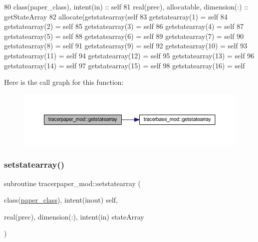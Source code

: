 \begin{DoxyCode}
80     \textcolor{keywordtype}{class}(paper\_class), \textcolor{keywordtype}{intent(in)} :: self
81     \textcolor{keywordtype}{real(prec)}, \textcolor{keywordtype}{allocatable}, \textcolor{keywordtype}{dimension(:)} :: getStateArray
82     \textcolor{keyword}{allocate}(getstatearray(self%
83     getstatearray(1) = self%
84     getstatearray(2) = self%
85     getstatearray(3) = self%
86     getstatearray(4) = self%
87     getstatearray(5) = self%
88     getstatearray(6) = self%
89     getstatearray(7) = self%
90     getstatearray(8) = self%
91     getstatearray(9) = self%
92     getstatearray(10) = self%
93     getstatearray(11) = self%
94     getstatearray(12) = self%
95     getstatearray(13) = self%
96     getstatearray(14) = self%
97     getstatearray(15) = self%
98     getstatearray(16) = self%
\end{DoxyCode}
Here is the call graph for this function\+:\nopagebreak
\begin{figure}[H]
\begin{center}
\leavevmode
\includegraphics[width=350pt]{namespacetracerpaper__mod_a703693333469e5091ec8de0a62171294_cgraph}
\end{center}
\end{figure}
\mbox{\label{namespacetracerpaper__mod_abda951b1d3a953fc25f24ee3ce8e2025}} 
\subsubsection{\texorpdfstring{setstatearray()}{setstatearray()}}
{\footnotesize\ttfamily subroutine tracerpaper\+\_\+mod\+::setstatearray (\begin{DoxyParamCaption}\item[{class(\mbox{\hyperlink{structtracerpaper__mod_1_1paper__class}{paper\+\_\+class}}), intent(inout)}]{self,  }\item[{real(prec), dimension(\+:), intent(in)}]{state\+Array }\end{DoxyParamCaption})\hspace{0.3cm}{\ttfamily [private]}}



